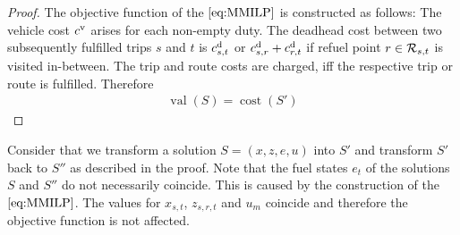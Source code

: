 \begin{proof}
The objective function of the $\eqref{eq:MMILP}$ is constructed as follows: The vehicle cost $c^{\operatorname{v}}$ arises for each non-empty duty. The deadhead cost between two subsequently fulfilled trips $s$ and $t$ is $c^{\operatorname{d}}_{s,t}$ or ${c^{\operatorname{d}}_{s,r}+c^{\operatorname{d}}_{r,t}}$ if refuel point ${r\in\mathcal{R}_{s,t}}$ is visited in-between. The trip and route costs are charged, iff the respective trip or route is fulfilled. Therefore
\begin{align*}
	\operatorname{val}(S) = \operatorname{cost}\left(S'\right)
\end{align*}

\end{proof}

\begin{remark}

Consider that we transform a solution ${S=(x,z,e,u)}$ into $S'$ and transform $S'$ back to $S''$ as described in the proof. Note that the fuel states $e_t$ of the solutions $S$ and $S''$ do not necessarily coincide. This is caused by the construction of the $\eqref{eq:MMILP}$. The values for $x_{s,t}$, $z_{s,r,t}$ and $u_m$ coincide and therefore the objective function is not affected.

\end{remark}